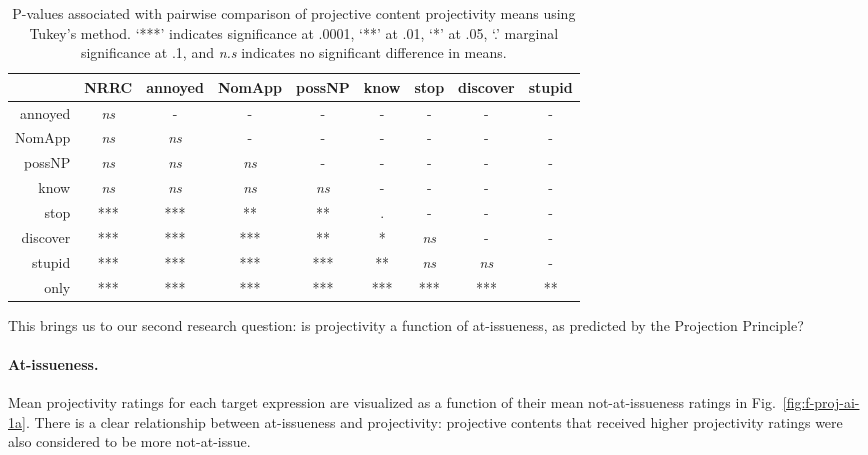 \documentclass[11pt,fleqn]{article}
\newcommand{\6}{\mbox{$[\hspace*{-.6mm}[$}}
\newcommand{\9}{\mbox{$]\hspace*{-.6mm}]$}}
\newcommand{\figref}[1]{Fig.~\ref{#1}}
\begin{document}
\begin{table}[!h]
\begin{center}
\begin{tabular}{r c c c c c c c c}
\toprule
 &   NRRC & annoyed & NomApp &  possNP &  know & stop & discover & stupid \\
 \midrule
annoyed &  \emph{ns}  &  -  &        -   &       -  &        -  &   - &     -   &  -\\     
NomApp  &  \emph{ns} & \emph{ns} & -    &   -   &    -    &   -  &     -   & - \\    
possNP  &    \emph{ns} & \emph{ns} & \emph{ns} & - &      -  &     -     &  -   & - \\    
know     &   \emph{ns} & \emph{ns} & \emph{ns} & \emph{ns} & -   &    -   &    -       & -\\
stop     &   *** & *** & ** & ** & . & - &  - & -\\      
discover  &   *** & *** & *** & ** & * & \emph{ns} & - & -      \\
stupid    &  *** & *** & *** & *** & ** & \emph{ns} & \emph{ns} & - \\
only      &  *** & *** & *** & *** & *** & *** & *** & ** \\
\bottomrule
\end{tabular}
\caption{P-values associated with pairwise comparison of projective content projectivity means using Tukey's method. `***' indicates significance at .0001, `**' at .01, `*' at .05, `.' marginal significance at .1, and \emph{n.s} indicates no significant difference in means.}\label{tab:pairwise}
\end{center}
\end{table}

This brings us to our second research question: is projectivity a function of at-issueness, as predicted by the Projection Principle?

\paragraph{At-issueness.} Mean projectivity ratings for each target expression are visualized as a function of their mean not-at-issueness ratings in \figref{fig:f-proj-ai-1a}. There is a clear relationship between at-issueness and projectivity: projective contents that received higher projectivity ratings were also considered to be more not-at-issue.
\end{document}
